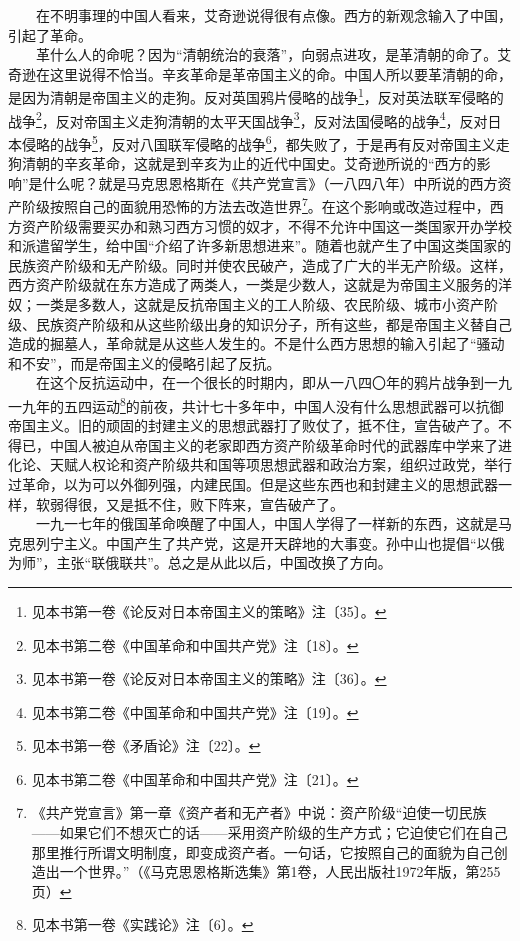 \documentclass[cn,11pt,chinese]{elegantbook}
\begin{document}
　　在不明事理的中国人看来，艾奇逊说得很有点像。西方的新观念输入了中国，引起了革命。\\
　　革什么人的命呢？因为“清朝统治的衰落”，向弱点进攻，是革清朝的命了。艾奇逊在这里说得不恰当。辛亥革命是革帝国主义的命。中国人所以要革清朝的命，是因为清朝是帝国主义的走狗。反对英国鸦片侵略的战争\footnote[6]{ 见本书第一卷《论反对日本帝国主义的策略》注〔35〕。}，反对英法联军侵略的战争\footnote[7]{ 见本书第二卷《中国革命和中国共产党》注〔18〕。}，反对帝国主义走狗清朝的太平天国战争\footnote[8]{ 见本书第一卷《论反对日本帝国主义的策略》注〔36〕。}，反对法国侵略的战争\footnote[9]{ 见本书第二卷《中国革命和中国共产党》注〔19〕。}，反对日本侵略的战争\footnote[10]{ 见本书第一卷《矛盾论》注〔22〕。}，反对八国联军侵略的战争\footnote[11]{ 见本书第二卷《中国革命和中国共产党》注〔21〕。}，都失败了，于是再有反对帝国主义走狗清朝的辛亥革命，这就是到辛亥为止的近代中国史。艾奇逊所说的“西方的影响”是什么呢？就是马克思恩格斯在《共产党宣言》（一八四八年）中所说的西方资产阶级按照自己的面貌用恐怖的方法去改造世界\footnote[12]{ 《共产党宣言》第一章《资产者和无产者》中说：资产阶级“迫使一切民族——如果它们不想灭亡的话——采用资产阶级的生产方式；它迫使它们在自己那里推行所谓文明制度，即变成资产者。一句话，它按照自己的面貌为自己创造出一个世界。”（《马克思恩格斯选集》第1卷，人民出版社1972年版，第255页）}。在这个影响或改造过程中，西方资产阶级需要买办和熟习西方习惯的奴才，不得不允许中国这一类国家开办学校和派遣留学生，给中国“介绍了许多新思想进来”。随着也就产生了中国这类国家的民族资产阶级和无产阶级。同时并使农民破产，造成了广大的半无产阶级。这样，西方资产阶级就在东方造成了两类人，一类是少数人，这就是为帝国主义服务的洋奴；一类是多数人，这就是反抗帝国主义的工人阶级、农民阶级、城市小资产阶级、民族资产阶级和从这些阶级出身的知识分子，所有这些，都是帝国主义替自己造成的掘墓人，革命就是从这些人发生的。不是什么西方思想的输入引起了“骚动和不安”，而是帝国主义的侵略引起了反抗。\\
　　在这个反抗运动中，在一个很长的时期内，即从一八四〇年的鸦片战争到一九一九年的五四运动\footnote[13]{ 见本书第一卷《实践论》注〔6〕。}的前夜，共计七十多年中，中国人没有什么思想武器可以抗御帝国主义。旧的顽固的封建主义的思想武器打了败仗了，抵不住，宣告破产了。不得已，中国人被迫从帝国主义的老家即西方资产阶级革命时代的武器库中学来了进化论、天赋人权论和资产阶级共和国等项思想武器和政治方案，组织过政党，举行过革命，以为可以外御列强，内建民国。但是这些东西也和封建主义的思想武器一样，软弱得很，又是抵不住，败下阵来，宣告破产了。\\
　　一九一七年的俄国革命唤醒了中国人，中国人学得了一样新的东西，这就是马克思列宁主义。中国产生了共产党，这是开天辟地的大事变。孙中山也提倡“以俄为师”，主张“联俄联共”。总之是从此以后，中国改换了方向。\\
\end{document}
